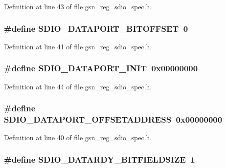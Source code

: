 Definition at line 43 of file gsn\_\-reg\_\-sdio\_\-spec.h.

\hypertarget{a00571_aa999e039a0dd03a83ea852eeff9dece6}{
\subsubsection[{SDIO\_\-DATAPORT\_\-BITOFFSET}]{\setlength{\rightskip}{0pt plus 5cm}\#define SDIO\_\-DATAPORT\_\-BITOFFSET~0}}
\label{a00571_aa999e039a0dd03a83ea852eeff9dece6}


Definition at line 41 of file gsn\_\-reg\_\-sdio\_\-spec.h.

\hypertarget{a00571_ace16f4316e53ccf8aa655facd776bb97}{
\subsubsection[{SDIO\_\-DATAPORT\_\-INIT}]{\setlength{\rightskip}{0pt plus 5cm}\#define SDIO\_\-DATAPORT\_\-INIT~0x00000000}}
\label{a00571_ace16f4316e53ccf8aa655facd776bb97}


Definition at line 44 of file gsn\_\-reg\_\-sdio\_\-spec.h.

\hypertarget{a00571_a15ea759eff08d666d76dfcfe0c42981a}{
\subsubsection[{SDIO\_\-DATAPORT\_\-OFFSETADDRESS}]{\setlength{\rightskip}{0pt plus 5cm}\#define SDIO\_\-DATAPORT\_\-OFFSETADDRESS~0x00000000}}
\label{a00571_a15ea759eff08d666d76dfcfe0c42981a}


Definition at line 40 of file gsn\_\-reg\_\-sdio\_\-spec.h.

\hypertarget{a00571_a34aa4999a26bc4a498c2d49d3c92affb}{
\subsubsection[{SDIO\_\-DATARDY\_\-BITFIELDSIZE}]{\setlength{\rightskip}{0pt plus 5cm}\#define SDIO\_\-DATARDY\_\-BITFIELDSIZE~1}}
\label{a00571_a34aa4999a26bc4a498c2d49d3c92affb}



